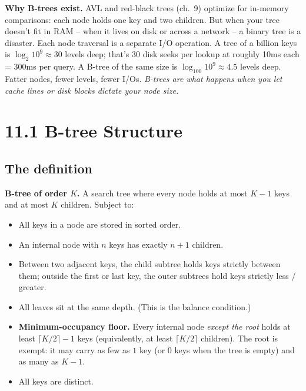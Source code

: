 \documentclass[11pt]{article}
\begin{document}
\begin{ideabox}
\textbf{Why B-trees exist.} AVL and red-black trees (ch.\ 9) optimize for in-memory comparisons: each node holds one key and two children. But when your tree doesn't fit in RAM -- when it lives on disk or across a network -- a binary tree is a disaster. Each node traversal is a separate I/O operation. A tree of a billion keys is $\log_2 10^9 \approx 30$ levels deep; that's 30 disk seeks per lookup at roughly 10ms each = 300ms per query. A B-tree of the same size is $\log_{100} 10^9 \approx 4.5$ levels deep. Fatter nodes, fewer levels, fewer I/Os. \emph{B-trees are what happens when you let cache lines or disk blocks dictate your node size.}
\end{ideabox}

\section{11.1 B-tree Structure}

\subsection*{The definition}

\begin{defnbox}
\textbf{B-tree of order $K$.} A search tree where every node holds at most $K-1$ keys and at most $K$ children. Subject to:
\begin{itemize}[leftmargin=*]
    \item All keys in a node are stored in sorted order.
    \item An internal node with $n$ keys has exactly $n+1$ children.
    \item Between two adjacent keys, the child subtree holds keys strictly between them; outside the first or last key, the outer subtrees hold keys strictly less / greater.
    \item All leaves sit at the same depth. (This is the balance condition.)
    \item \textbf{Minimum-occupancy floor.} Every internal node \emph{except the root} holds at least $\lceil K/2 \rceil - 1$ keys (equivalently, at least $\lceil K/2 \rceil$ children). The root is exempt: it may carry as few as $1$ key (or $0$ keys when the tree is empty) and as many as $K-1$.
    \item All keys are distinct.
\end{itemize}
\end{defnbox}
\end{document}
